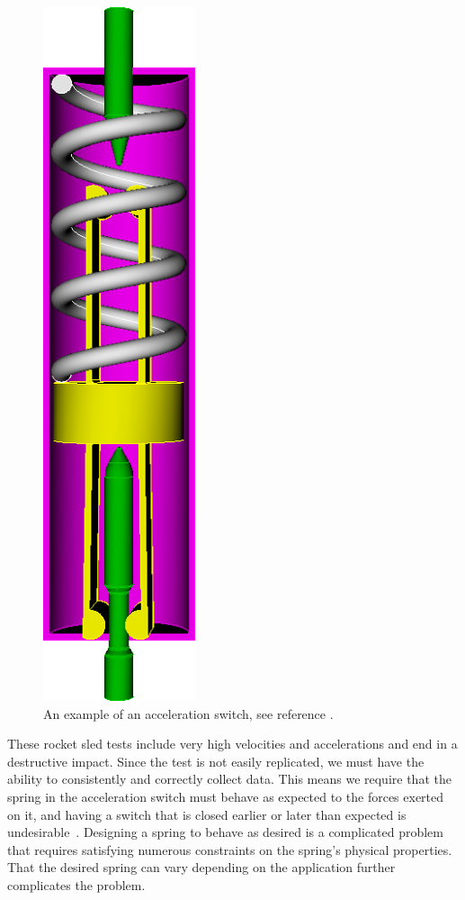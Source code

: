 \documentclass[10pt]{article}
\begin{document}
		\begin{figure}[h]
		 \begin{center}\includegraphics[scale=.2]{Acceleration_Switch.png}\end{center}
		 \caption{An example of an acceleration switch, see reference \cite{Massad2015}.}
		 \label{Acceleration Switch}
		 
		 \end{figure}	 
		
These rocket sled tests include very high velocities and accelerations and end in a destructive impact. Since the test is not easily replicated, we must have the ability to consistently and correctly collect data. This means we require that the spring in the acceleration switch must behave as expected to the forces exerted on it, and having a switch that is closed earlier or later than expected is undesirable~\cite{IMSM2010}. Designing a spring to behave as desired is a complicated problem that requires satisfying numerous constraints on the spring's physical properties. That the desired spring can vary depending on the application further complicates the problem. 
\end{document}
